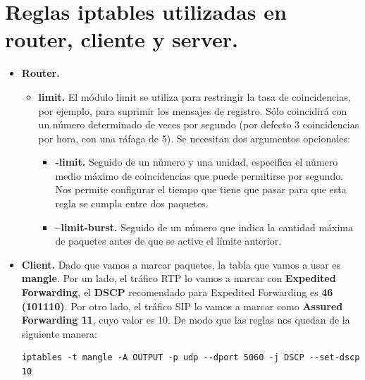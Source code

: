 \documentclass[11pt]{article}
\begin{document}
\section{Reglas iptables utilizadas en router, cliente y server.}
\begin{itemize}
\item \textbf{Router.}
	\begin{itemize}
	En el caso del router hemos utilizado las reglas iptables que vienen dadas en el enunciado de la práctica. Estas son:
\begin{lstlisting}[style=C,numbers=none]		
iptables -t filter -A INPUT -m dscp --dscp 14 -m limit --limit 5/s --limit-burst 5 -j ACCEPT

iptables -t filter -A INPUT -m dscp --dscp 14 -j DROP		
\end{lstlisting}
	Donde los parámetros --limit y --limit-burst significan lo siguiente.
	\item \textbf{limit.} El módulo limit se utiliza para restringir la tasa de coincidencias, por ejemplo, para suprimir los mensajes de registro. Sólo coincidirá con un número determinado de veces por segundo (por defecto 3 coincidencias por hora, con una ráfaga de 5). Se necesitan dos argumentos opcionales: 
		\begin{itemize}
			\item \textbf{-limit.} Seguido de un número y una unidad, especifica el número medio máximo de coincidencias que puede permitirse por segundo. Nos permite configurar el tiempo que tiene que pasar para que esta regla se cumpla entre dos paquetes.
			\item \textbf{--limit-burst.} Seguido de un número que indica la cantidad máxima de paquetes antes de que se active el límite anterior. \\
		\end{itemize}
	\end{itemize}
	
\item \textbf{Client.}
	Dado que vamos a marcar paquetes, la tabla que vamos a usar es \textbf{mangle}. Por un lado, el tráfico RTP lo vamos a marcar con \textbf{Expedited Forwarding}, el \textbf{DSCP} recomendado para Expedited Forwarding es \textbf{46 (101110)}. Por otro lado, el tráfico SIP lo vamos a marcar como \textbf{Assured Forwarding 11}, cuyo valor es 10. De modo que las reglas nos quedan de la siguiente manera:
\begin{lstlisting}[style=C,numbers=none]
iptables -t mangle -A OUTPUT -p udp --dport 5060 -j DSCP --set-dscp 10


\end{lstlisting}
\end{itemize}
\end{document}
